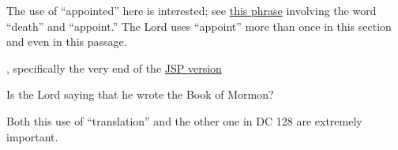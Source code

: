 \begin{compactdesc}
			\item[{\hyperref[DC20-8]{DC 20:8--12}}]
			\item[{\hyperref[DC21-1]{DC 21:1}}] 
			\item[{\hyperref[DC24-1]{DC 24:1}}] 
			\item[{\hyperref[DC35-20]{DC 35:20}}]
			\item[{\hyperref[DC37-1]{DC 37:1}}] 
			\item[{\hyperref[DC41-7]{DC 41:7}}] 
			\item[{\hyperref[DC42-15]{DC 42:15}}] 
			\item[{\hyperref[DC42-56]{DC 42:56--59}}]
				\begin{compactitem}
					\item The use of ``appointed'' here is interested; see \hyperref[DEATH-PHRASES]{this phrase} involving the word ``death'' and ``appoint.'' The Lord uses ``appoint'' more than once in this section and even in this passage.
				\end{compactitem}
			\item[{\hyperref[DC45-60]{DC 45:60--61}}]
			\item[{\hyperref[DC59]{DC 59}}], specifically the very end of the \hyperref[EMS-1831-JS-7-AUG-1831]{JSP version}
			\item[{\hyperref[DC73-3]{DC 73:3--4}}]
			\item[{\hyperref[DC76-15]{DC 76:15--18}}]
			\item[{\hyperref[DC77]{DC 77}}]
			\item[{\hyperref[DC84-57]{DC 84:57}}]
				\begin{compactitem}
					\item Is the Lord saying that he wrote the Book of Mormon?
				\end{compactitem} 
			\item[{\hyperref[DC90-13]{DC 90:13}}]
			\item[{\hyperref[DC91]{DC 91}}]
			\item[{\hyperref[DC94-10]{DC 94:10}}]
			\item[{\hyperref[DC107-92]{DC 107:92}}]
			\item[{\hyperref[DC124-89]{DC 124:89}}]
			\item[{\hyperref[DC128-8]{DC 128:8}}]
				\begin{compactitem}
					\item Both this use of ``translation'' and the other one in DC 128 are extremely important.
				\end{compactitem}
			\item[{\hyperref[DC128-18]{DC 128:18}}]
		\end{compactdesc}
		
